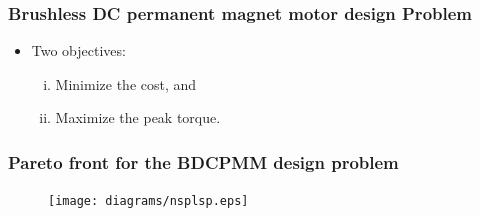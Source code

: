 \documentclass[svgnames, table, smaller]{beamer}
\begin{document}
\begin{frame}[allowframebreaks]
  \frametitle{Brushless DC permanent magnet motor design Problem}


  \begin{itemize}
  \item Two objectives:
    \begin{enumerate}[(i)]
    \item Minimize the cost, and
    \item Maximize the peak torque.
    \end{enumerate}
  \end{itemize}
  

  \begin{figure}[ht]
    \begin{center}
      \label{bdcpmvars}
    \end{center}
  \end{figure}



 
\end{frame}


\begin{frame}
  \frametitle{Pareto front for the BDCPMM design problem}
  \begin{figure}[ht]\begin{center}
      \texttt{[image: diagrams/nsplsp.eps]} 
      \label{nsplsp}
    \end{center}
  \end{figure}
\end{frame}
\end{document}
